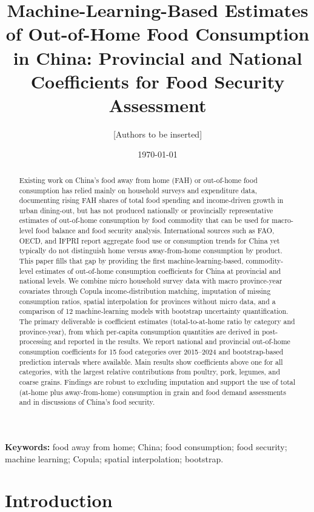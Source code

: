 \documentclass[12pt,a4paper]{article}
\title{Machine-Learning-Based Estimates of Out-of-Home Food Consumption in China: Provincial and National Coefficients for Food Security Assessment}
\author{[Authors to be inserted]}
\date{\today}
\begin{document}
\maketitle

\begin{abstract}
Existing work on China's food away from home (FAH) or out-of-home food consumption has relied mainly on household surveys and expenditure data, documenting rising FAH shares of total food spending and income-driven growth in urban dining-out, but has not produced nationally or provincially representative estimates of out-of-home consumption by food commodity that can be used for macro-level food balance and food security analysis. International sources such as FAO, OECD, and IFPRI report aggregate food use or consumption trends for China yet typically do not distinguish home versus away-from-home consumption by product. This paper fills that gap by providing the first machine-learning-based, commodity-level estimates of out-of-home consumption coefficients for China at provincial and national levels. We combine micro household survey data with macro province-year covariates through Copula income-distribution matching, imputation of missing consumption ratios, spatial interpolation for provinces without micro data, and a comparison of 12 machine-learning models with bootstrap uncertainty quantification. The primary deliverable is coefficient estimates (total-to-at-home ratio by category and province-year), from which per-capita consumption quantities are derived in post-processing and reported in the results. We report national and provincial out-of-home consumption coefficients for 15 food categories over 2015--2024 and bootstrap-based prediction intervals where available. Main results show coefficients above one for all categories, with the largest relative contributions from poultry, pork, legumes, and coarse grains. Findings are robust to excluding imputation and support the use of total (at-home plus away-from-home) consumption in grain and food demand assessments and in discussions of China's food security.
\end{abstract}

\noindent\textbf{Keywords:} food away from home; China; food consumption; food security; machine learning; Copula; spatial interpolation; bootstrap.

\section{Introduction}
\label{sec:introduction}
\end{document}
